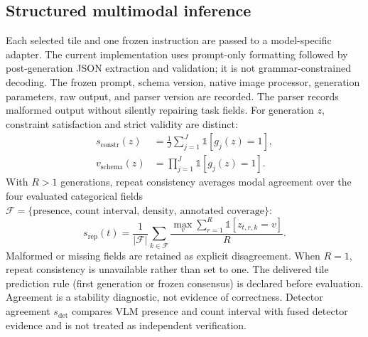 \subsection{Structured multimodal inference}
Each selected tile and one frozen instruction are passed to a model-specific adapter. The current implementation uses prompt-only formatting followed by post-generation JSON extraction and validation; it is not grammar-constrained decoding. The frozen prompt, schema version, native image processor, generation parameters, raw output, and parser version are recorded. The parser records malformed output without silently repairing task fields. For generation $z$, constraint satisfaction and strict validity are distinct:
\begin{align}
s_{\mathrm{constr}}(z)&=\frac{1}{J}\sum_{j=1}^{J}\mathbb{1}[g_j(z)=1], \\
v_{\mathrm{schema}}(z)&=\prod_{j=1}^{J}\mathbb{1}[g_j(z)=1].
\label{eq:schema}
\end{align}
With $R>1$ generations, repeat consistency averages modal agreement over the four evaluated categorical fields $\mathcal{F}=\{\text{presence, count interval, density, annotated coverage}\}$:
\begin{equation}
s_{\mathrm{rep}}(t)=\frac{1}{|\mathcal{F}|}
\sum_{k\in\mathcal{F}}
\frac{\max_v\sum_{r=1}^{R}\mathbb{1}[z_{t,r,k}=v]}{R}.
\label{eq:consistency}
\end{equation}
Malformed or missing fields are retained as explicit disagreement. When $R=1$, repeat consistency is unavailable rather than set to one. The delivered tile prediction rule (first generation or frozen consensus) is declared before evaluation. Agreement is a stability diagnostic, not evidence of correctness. Detector agreement $s_{\mathrm{det}}$ compares VLM presence and count interval with fused detector evidence and is not treated as independent verification.

